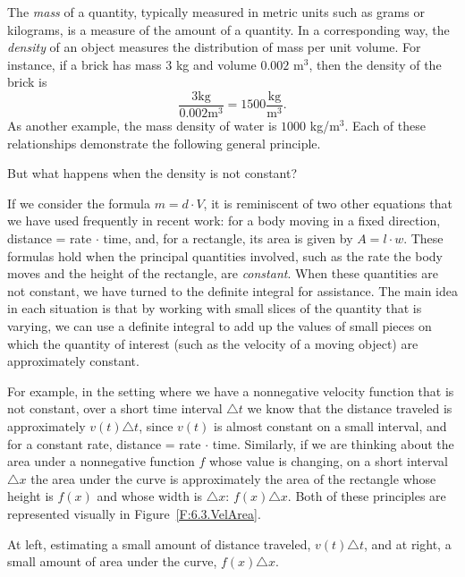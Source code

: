 The \emph{mass}  of a quantity, typically measured in metric units such as grams or kilograms, is a measure of the amount of a quantity.  In a corresponding way, the \emph{density} of an object measures the distribution of mass per unit volume.  For instance, if a brick has mass $3$ kg and volume $0.002$ m$^3$, then the density of the brick is 
$$\frac{3 \mbox{kg}}{0.002 \mbox{m}^3} = 1500 \frac{\mbox{kg}}{\mbox{m}^3}.$$
As another example, the mass density of water is $1000$ kg/m$^3$.  Each of these relationships demonstrate the following general principle.  


But what happens when the density is not constant?

If we consider the formula $m = d \cdot V$, it is reminiscent of two other equations that we have used frequently in recent work:  for a body moving in a fixed direction, distance = rate $\cdot$ time, and, for a rectangle, its area is given by $A = l \cdot w$.  These formulas hold when the principal quantities involved, such as the rate the body moves and the height of the rectangle, are \emph{constant}.  When these quantities are not constant, we have turned to the definite integral for assistance.  The main idea in each situation is that by working with small slices of the quantity that is varying, we can use a definite integral to add up the values of small pieces on which the quantity of interest (such as the velocity of a moving object) are approximately constant.

For example, in the setting where we have a nonnegative velocity function that is not constant, over a short time interval $\triangle t$ we know that the distance traveled is approximately $v(t) \triangle t$, since $v(t)$ is almost constant on a small interval, and for a constant rate, distance = rate $\cdot$ time.  Similarly, if we are thinking about the area under a nonnegative function $f$ whose value is changing, on a short interval $\triangle x$ the area under the curve is approximately the area of the rectangle whose height is $f(x)$ and whose width is $\triangle x$:  $f(x) \triangle x$.  Both of these principles are represented visually in Figure~\ref{F:6.3.VelArea}.  

\begin{marginfigure} %
\caption{At left, estimating a small amount of distance traveled, $v(t) \triangle t$, and at right, a small amount of area under the curve, $f(x) \triangle x$.} \label{F:6.3.VelArea}
\end{marginfigure}

